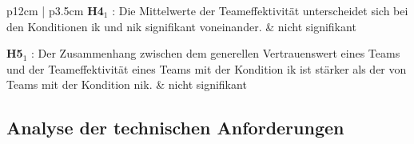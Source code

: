 \documentclass[a4paper,11pt]{article}%
\renewcommand{\\}{\vspace*{0.5\baselineskip} \newline}
\begin{document}
\begin{table}[H]
\begin{tabularx}{\textwidth}{p{12cm} | p{3.5cm}}
		\hline 	\\	
		\textbf{H4$_{1}$} : Die Mittelwerte der Teameffektivität unterscheidet sich bei den Konditionen \ac{ik} und \ac{nik} signifikant voneinander.\\
		& nicht signifikant\\

		\hline 	\\	
			\textbf{H5$_{1}$} : Der Zusammenhang zwischen dem generellen Vertrauenswert eines Teams und der Teameffektivität eines Teams mit der Kondition \ac{ik} ist stärker als der von Teams mit der Kondition \ac{nik}. \\
		& nicht signifikant \\
		
		\hline 	\\
		
	\end{tabularx}
\end{table}		


\subsection{Analyse der technischen Anforderungen}
\end{document}
